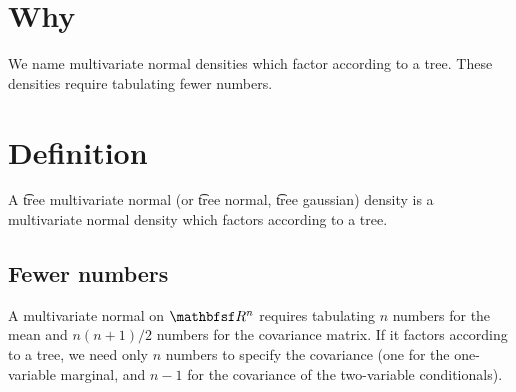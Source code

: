 
\section*{Why}

We name multivariate normal densities which factor according to a tree.
These densities require tabulating fewer numbers.

\section*{Definition}

A \t{tree multivariate normal} (or \t{tree normal}, \t{tree gaussian}) density is a multivariate normal density which factors according to a tree.

\subsection*{Fewer numbers}

A multivariate normal on $\R ^n$ requires tabulating $n$ numbers for the mean and $n(n+1)/2$ numbers for the covariance matrix. If it factors according to a tree, we need only $n$ numbers to specify the covariance (one for the one-variable marginal, and $n-1$ for the covariance of the two-variable conditionals).

\blankpage